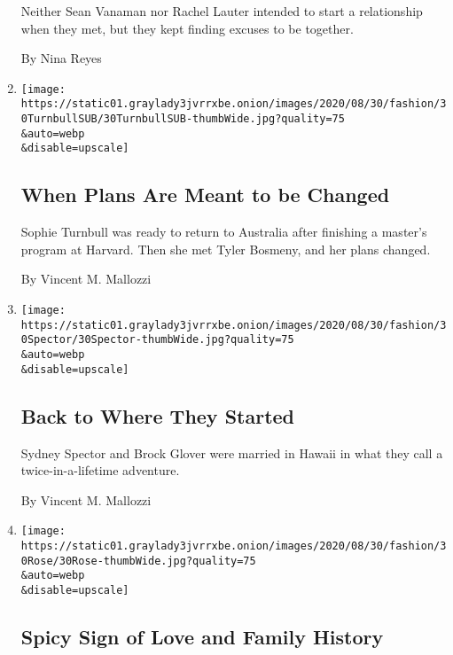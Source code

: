 \begin{enumerate}
  Neither Sean Vanaman nor Rachel Lauter intended to start a
  relationship when they met, but they kept finding excuses to be
  together.

  By Nina Reyes
\item
  \href{/2020/08/28/fashion/weddings/when-plans-are-meant-to-be-changed.html}{}

  \texttt{[image: https://static01.graylady3jvrrxbe.onion/images/2020/08/30/fashion/30TurnbullSUB/30TurnbullSUB-thumbWide.jpg?quality=75\\\&auto=webp\\\&disable=upscale]}

  \hypertarget{when-plans-are-meant-to-be-changed}{%
  \subsection{When Plans Are Meant to be
  Changed}\label{when-plans-are-meant-to-be-changed}}

  Sophie Turnbull was ready to return to Australia after finishing a
  master's program at Harvard. Then she met Tyler Bosmeny, and her plans
  changed.

  By Vincent M. Mallozzi
\item
  \href{/2020/08/28/fashion/weddings/back-to-where-they-started.html}{}

  \texttt{[image: https://static01.graylady3jvrrxbe.onion/images/2020/08/30/fashion/30Spector/30Spector-thumbWide.jpg?quality=75\\\&auto=webp\\\&disable=upscale]}

  \hypertarget{back-to-where-they-started}{%
  \subsection{Back to Where They
  Started}\label{back-to-where-they-started}}

  Sydney Spector and Brock Glover were married in Hawaii in what they
  call a twice-in-a-lifetime adventure.

  By Vincent M. Mallozzi
\item
  \href{/2020/08/28/fashion/weddings/spicy-sign-of-love-and-family-history.html}{}

  \texttt{[image: https://static01.graylady3jvrrxbe.onion/images/2020/08/30/fashion/30Rose/30Rose-thumbWide.jpg?quality=75\\\&auto=webp\\\&disable=upscale]}

  \hypertarget{spicy-sign-of-love-and-family-history}{%
  \subsection{Spicy Sign of Love and Family
  History}\label{spicy-sign-of-love-and-family-history}}


\end{enumerate}
